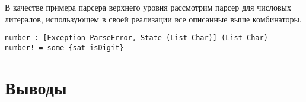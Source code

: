 \documentclass [a4paper] {article}
\begin{document}
В качестве примера парсера верхнего уровня рассмотрим парсер для числовых
литералов, использующем в своей реализации все описанные выше комбинаторы.

\begin{verbatim}
number : [Exception ParseError, State (List Char)] (List Char)
number! = some {sat isDigit}
\end{verbatim}

\section{Выводы}

\printbibliography

\end{document}

